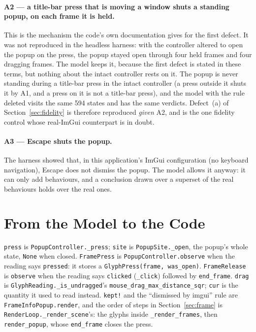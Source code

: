 \documentclass[a4paper,10pt,fleqn]{article}
\begin{document}
\paragraph{A2 --- a title-bar press that is moving a window shuts a standing
popup, on each frame it is held.}
This is the mechanism the code's own documentation gives for the first defect.
It was not reproduced in the headless harness: with the controller altered to open
the popup on the press, the popup stayed open through four held frames and four
dragging frames.  The model keeps it, because the first defect is stated in
these terms, but nothing about the intact controller rests on it.  The popup is
never standing during a title-bar press in the intact controller (a press outside
it shuts it by A1, and a press on it is not a title-bar press), and the model with
the rule deleted visits the same 594 states and has the same verdicts.  Defect~(a)
of Section~\ref{sec:fidelity} is therefore reproduced \emph{given} A2, and is the
one fidelity control whose real-ImGui counterpart is in doubt.

\paragraph{A3 --- Escape shuts the popup.}
The harness showed that, in this application's ImGui configuration (no keyboard
navigation), Escape does not dismiss the popup.  The model allows it anyway:
it can only add behaviours, and a conclusion drawn over a superset of the
real behaviours holds over the real ones.

\section{From the Model to the Code}

\texttt{press} is \texttt{PopupController.\_press}; \texttt{site} is
\texttt{PopupSite.\_open}, the popup's whole state, \texttt{None} when closed.
\texttt{FramePress} is \texttt{PopupController.observe} when the reading says
\texttt{pressed}: it stores a \texttt{GlyphPress(frame, was\_open)}.
\texttt{FrameRelease} is \texttt{observe} when the reading says \texttt{clicked}
(\texttt{\_click}) followed by \texttt{end\_frame}.  \texttt{drag} is
\texttt{GlyphReading.\_is\_undragged}'s
\texttt{mouse\_drag\_max\_distance\_sqr}; \texttt{cur} is the quantity it used to
read instead.  \texttt{kept!} and the ``dismissed by imgui'' rule are
\texttt{FrameInfoPopup.render}, and the order of steps in
Section~\ref{sec:frame} is \texttt{RenderLoop.\_render\_scene}'s: the glyphs
inside \texttt{\_render\_frames}, then \texttt{render\_popup}, whose
\texttt{end\_frame} closes the press.
\end{document}
